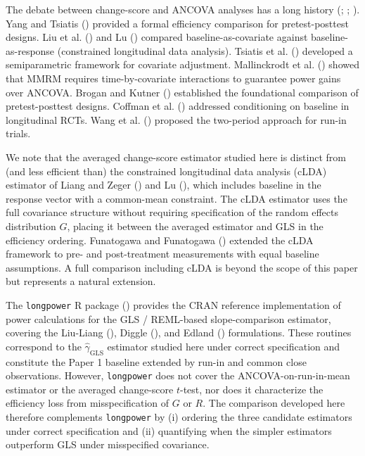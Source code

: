 \documentclass[
  11pt,
]{article}
\begin{document}
The debate between change-score and ANCOVA analyses has a long history
(; ; ). Yang and
Tsiatis () provided a formal efficiency
comparison for pretest-posttest designs. Liu et al.
() and Lu ()
compared baseline-as-covariate against baseline-as-response (constrained
longitudinal data analysis). Tsiatis et al.
() developed a semiparametric framework
for covariate adjustment. {Mallinckrodt et al.}
() showed that MMRM requires
time-by-covariate interactions to guarantee power gains over ANCOVA.
Brogan and Kutner () established the
foundational comparison of pretest-posttest designs. Coffman et al.
() addressed conditioning on baseline in
longitudinal RCTs. Wang et al. () proposed
the two-period approach for run-in trials.

We note that the averaged change-score estimator studied here is
distinct from (and less efficient than) the constrained longitudinal
data analysis (cLDA) estimator of Liang and Zeger
() and Lu (),
which includes baseline in the response vector with a common-mean
constraint. The cLDA estimator uses the full covariance structure
without requiring specification of the random effects distribution
\(G\), placing it between the averaged estimator and GLS in the
efficiency ordering. Funatogawa and Funatogawa
() extended the cLDA framework to
pre- and post-treatment measurements with equal baseline assumptions. A
full comparison including cLDA is beyond the scope of this paper but
represents a natural extension.

The \texttt{longpower} R package () provides the CRAN reference implementation of power
calculations for the GLS / REML-based slope-comparison estimator,
covering the Liu-Liang (), Diggle (), and
Edland () formulations. These
routines correspond to the \(\hat\gamma_{\text{GLS}}\) estimator studied
here under correct specification and constitute the Paper 1 baseline
extended by run-in and common close observations. However,
\texttt{longpower} does not cover the ANCOVA-on-run-in-mean estimator or
the averaged change-score \(t\)-test, nor does it characterize the
efficiency loss from misspecification of \(G\) or \(R\). The comparison
developed here therefore complements \texttt{longpower} by (i) ordering
the three candidate estimators under correct specification and (ii)
quantifying when the simpler estimators outperform GLS under
misspecified covariance.
\end{document}
